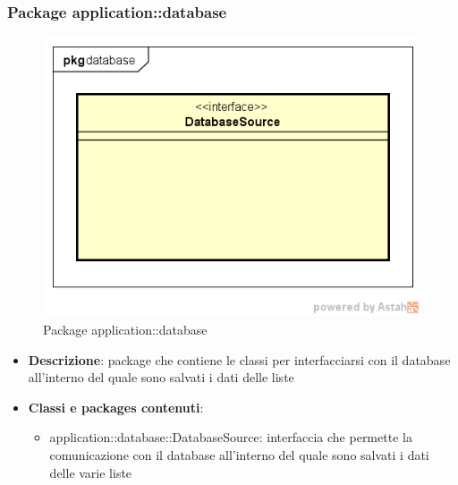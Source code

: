 \subsubsection{Package application::database}
\label{Package application::database}
\begin{figure}[H]
	\centering
	\includegraphics[scale=0.5]{Sezioni/Packages/Application/database.png}
	\caption{Package application::database}
\end{figure}
\begin{itemize}
	\item \textbf{Descrizione}: package che contiene le classi per interfacciarsi con il database all'interno del quale sono salvati i dati delle liste
	\item \textbf{Classi e packages contenuti}:
	\begin{itemize}
	\item application::database::DatabaseSource: interfaccia che permette la comunicazione con il database all'interno del quale sono salvati i dati delle varie liste
	\end{itemize}
\end{itemize}

